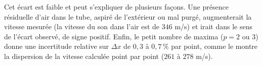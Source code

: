 Cet écart est faible et peut s'expliquer de plusieurs façons. Une présence résiduelle d'air dans le tube, aspiré de l'extérieur ou mal purgé, augmenterait la vitesse mesurée (la vitesse du son dans l'air est de $346$ m/s) et irait dans le sens de l'écart observé, de signe positif. Enfin, le petit nombre de maxima ($p = 2$ ou $3$) donne une incertitude relative sur $\Delta x$ de $0{,}3$ à $0{,}7\,\%$ par point, comme le montre la dispersion de la vitesse calculée point par point ($261$ à $278$ m/s).
